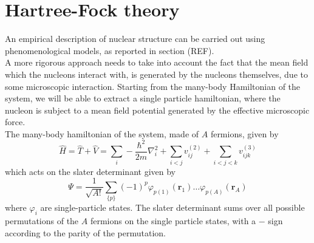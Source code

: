 \section{Hartree-Fock theory}
An empirical description of nuclear structure can be carried out using phenomenological models, as reported in section (REF).
\\A more rigorous approach needs to take into account the fact that the mean field which the nucleons interact with, is generated by the nucleons themselves, due to some microscopic interaction.
Starting from the many-body Hamiltonian of the system, we will be able to extract a single particle hamiltonian, where the nucleon is subject to a mean field potential generated by the effective microscopic force.
\\The many-body hamiltonian of the system, made of $A$ fermions, given by
\begin{equation}
    \label{eq:mb_hamiltonian}
    \hat H = \hat T + \hat V = \sum_i -\frac{\hbar^2}{2m}\nabla^2_i + \sum_{i<j} v^{(2)}_{ij} + \sum_{i<j<k} v^{(3)}_{ijk }
\end{equation}
which acts on the slater determinant given by 
\begin{equation}
    \label{eq:slater_formula}
    \Psi = \frac{1}{\sqrt {A!}} \sum_{\{p\}} (-1)^{p}  \varphi_{p(1)}(\bm r_1)\ldots \varphi_{p(A)}(\bm r_A)
\end{equation}
where $\varphi_i$ are single-particle states.
The slater determinant sums over all possible permutations of the $A$ fermions on the single particle states, with a $-$ sign according to the parity of the permutation.
